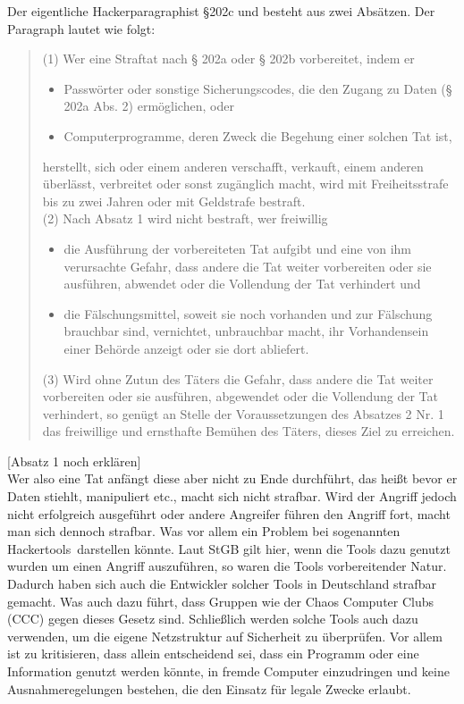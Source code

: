 \documentclass[10pt,a4paper]{article}
\begin{document}
Der eigentliche \glqq Hackerparagraph\grqq ist §202c und besteht aus zwei Absätzen. Der Paragraph lautet wie folgt:
\begin{quote}
(1) Wer eine Straftat nach § 202a oder § 202b vorbereitet, indem er 
\begin{itemize}
	\item[1.] Passwörter oder sonstige Sicherungscodes, die den Zugang zu Daten (§ 202a Abs. 2) ermöglichen, oder 
	\item[2.] Computerprogramme, deren Zweck die Begehung einer solchen Tat ist,
\end{itemize}
herstellt, sich oder einem anderen verschafft, verkauft, einem anderen überlässt, verbreitet oder sonst zugänglich macht, wird mit Freiheitsstrafe bis zu zwei Jahren oder mit Geldstrafe bestraft.\\
(2) Nach Absatz 1 wird nicht bestraft, wer freiwillig 
\begin{itemize}
	\item[1.] die Ausführung der vorbereiteten Tat aufgibt und eine von ihm verursachte Gefahr, dass andere die Tat weiter vorbereiten oder sie ausführen, abwendet oder die Vollendung der Tat verhindert und 
	\item[2.] die Fälschungsmittel, soweit sie noch vorhanden und zur Fälschung brauchbar sind, vernichtet, unbrauchbar macht, ihr Vorhandensein einer Behörde anzeigt oder sie dort abliefert.
\end{itemize}
(3) Wird ohne Zutun des Täters die Gefahr, dass andere die Tat weiter vorbereiten oder sie ausführen, abgewendet oder die Vollendung der Tat verhindert, so genügt an Stelle der Voraussetzungen des Absatzes 2 Nr. 1 das freiwillige und ernsthafte Bemühen des Täters, dieses Ziel zu erreichen.
\end{quote}
[Absatz 1 noch erklären]\\
Wer also eine Tat anfängt diese aber nicht zu Ende durchführt, das heißt bevor er Daten stiehlt, manipuliert etc., macht sich nicht strafbar. Wird der Angriff jedoch nicht erfolgreich ausgeführt oder andere Angreifer führen den Angriff fort, macht man sich dennoch strafbar. Was vor allem ein Problem bei sogenannten \glqq Hackertools\grqq \ darstellen könnte. Laut StGB gilt hier, wenn die Tools dazu genutzt wurden um einen Angriff auszuführen, so waren die Tools vorbereitender Natur. Dadurch haben sich auch die Entwickler solcher Tools in Deutschland strafbar gemacht. Was auch dazu führt, dass Gruppen wie der Chaos Computer Clubs (CCC) gegen dieses Gesetz sind. Schließlich werden solche Tools auch dazu verwenden, um die eigene Netzstruktur auf Sicherheit zu überprüfen. Vor allem ist zu kritisieren, dass allein entscheidend sei, dass ein Programm oder eine Information genutzt werden könnte, in fremde Computer einzudringen und keine Ausnahmeregelungen bestehen, die den Einsatz für legale Zwecke erlaubt. 
\end{document}
